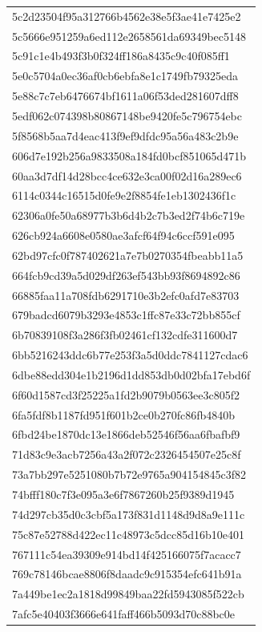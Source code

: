 \begin{tabular}{l}
5c2d23504f95a312766b4562e38e5f3ae41e7425e2 \\
5c5666e951259a6ed112e2658561da69349bec5148 \\
5c91c1e4b493f3b0f324ff186a8435c9c40f085ff1 \\
5e0c5704a0ec36af0cb6ebfa8e1c1749fb79325eda \\
5e88c7c7eb6476674bf1611a06f53ded281607dff8 \\
5edf062c074398b80867148be9420fe5c796754ebc \\
5f8568b5aa7d4eac413f9ef9dfdc95a56a483c2b9e \\
606d7e192b256a9833508a184fd0bcf851065d471b \\
60aa3d7df14d28bcc4ce632e3ca00f02d16a289ec6 \\
6114c0344c16515d0fe9e2f8854fe1eb1302436f1c \\
62306a0fe50a68977b3b6d4b2c7b3ed2f74b6c719e \\
626cb924a6608e0580ae3afcf64f94c6ccf591e095 \\
62bd97cfc0f787402621a7e7b0270354fbeabb11a5 \\
664fcb9cd39a5d029df263ef543bb93f8694892c86 \\
66885faa11a708fdb6291710e3b2efc0afd7e83703 \\
679badcd6079b3293e4853c1ffc87e33c72bb855cf \\
6b70839108f3a286f3fb02461cf132cdfe311600d7 \\
6bb5216243ddc6b77e253f3a5d0ddc7841127cdac6 \\
6dbe88edd304e1b2196d1dd853db0d02bfa17ebd6f \\
6f60d1587cd3f25225a1fd2b9079b0563ee3c805f2 \\
6fa5fdf8b1187fd951f601b2ce0b270fc86fb4840b \\
6fbd24be1870dc13e1866deb52546f56aa6fbafbf9 \\
71d83c9e3acb7256a43a2f072c2326454507e25c8f \\
73a7bb297e5251080b7b72e9765a904154845c3f82 \\
74bfff180c7f3e095a3e6f7867260b25f9389d1945 \\
74d297cb35d0c3cbf5a173f831d1148d9d8a9e111c \\
75c87e52788d422ec11c48973c5dcc85d16b10e401 \\
767111c54ea39309e914bd14f425166075f7acacc7 \\
769c78146bcae8806f8daadc9c915354efc641b91a \\
7a449be1ec2a1818d99849baa22fd5943085f522cb \\
7afc5e40403f3666e641faff466b5093d70c88bc0e \\

\end{tabular}

